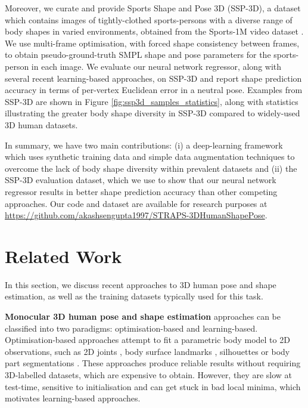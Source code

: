 \documentclass{bmvc2k}
\begin{document}
Moreover, we curate and provide Sports Shape and Pose 3D (SSP-3D), a dataset which contains images of tightly-clothed sports-persons with a diverse range of body shapes in varied environments, obtained from the Sports-1M video dataset \cite{KarpathyCVPR14}. We use multi-frame optimisation, with forced shape consistency between frames, to obtain pseudo-ground-truth SMPL shape and pose parameters for the sports-person in each image. We evaluate our neural network regressor, along with several recent learning-based approaches, on SSP-3D and report shape prediction accuracy in terms of per-vertex Euclidean error in a neutral pose. Examples from SSP-3D are shown in Figure \ref{fig:ssp3d_samples_statistics}, along with statistics illustrating the greater body shape diversity in SSP-3D compared to widely-used 3D human datasets.

In summary, we have two main contributions: (i) a deep-learning framework which uses synthetic training data and simple data augmentation techniques to overcome the lack of body shape diversity within prevalent datasets and (ii) the SSP-3D evaluation dataset, which we use to show that our neural network regressor results in better shape prediction accuracy than other competing approaches. Our code and dataset are available for research purposes at \url{https://github.com/akashsengupta1997/STRAPS-3DHumanShapePose}.

\section{Related Work}
\label{sec:related_work}

In this section, we discuss recent approaches to 3D human pose and shape estimation, as well as the training datasets typically used for this task.

\noindent \textbf{Monocular 3D human pose and shape estimation} approaches can be classified into two paradigms: optimisation-based and learning-based. Optimisation-based approaches attempt to fit a parametric body model \cite{Anguelov05scape:shape, SMPL:2015, SMPL-X:2019} to 2D observations, such as 2D joints \cite{Bogo:ECCV:2016, SMPL-X:2019}, body surface landmarks \cite{Lassner:UP:2017}, silhouettes \cite{Lassner:UP:2017} or body part segmentations \cite{Zanfir_2018_CVPR}. These approaches produce reliable results without requiring 3D-labelled datasets, which are expensive to obtain. However, they are slow at test-time, sensitive to initialisation and can get stuck in bad local minima, which motivates learning-based approaches.
\end{document}
